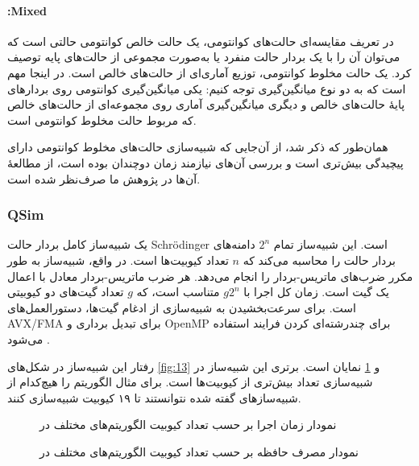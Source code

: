 \paragraph{:Mixed}
در تعریف مقایسه‌ای حالت‌های کوانتومی، یک حالت خالص کوانتومی حالتی است که می‌توان آن را با یک بردار حالت منفرد یا به‌صورت مجموعی از حالت‌های پایه توصیف کرد. یک حالت مخلوط کوانتومی، توزیع آماری‌ای از حالت‌های خالص است. در اینجا مهم است که به دو نوع میانگین‌گیری توجه کنیم: یکی میانگین‌گیری کوانتومی روی بردارهای پایهٔ حالت‌های خالص و دیگری میانگین‌گیری آماری روی مجموعه‌ای از حالت‌های خالص که مربوط حالت مخلوط کوانتومی است.

همان‌طور که ذکر شد، از آن‌جایی که شبیه‌سازی حالت‌های مخلوط کوانتومی دارای پیچیدگی بیش‌تری است و بررسی آن‌های نیازمند زمان دوچندان بوده است، از مطالعهٔ آن‌ها در پژوهش ما صرف‌نظر شده است.
\subsubsection{QSim}
یک شبیه‌ساز کامل بردار حالت Schrödinger است. این شبیه‌ساز تمام $2^n$ دامنه‌های بردار حالت را محاسبه می‌کند که $n$ تعداد کیوبیت‌ها است. در واقع، شبیه‌ساز به طور مکرر ضرب‌های ماتریس-بردار را انجام می‌دهد. هر ضرب ماتریس-بردار معادل با اعمال یک گیت است. زمان کل اجرا با $g2^n$ متناسب است، که $g$ تعداد گیت‌های دو کیوبیتی است. برای سرعت‌بخشیدن به شبیه‌سازی از ادغام گیت‌ها، دستورالعمل‌های AVX/FMA برای تبدیل برداری و OpenMP برای چندرشته‌ای کردن فرایند استفاده می‌شود
\cite{smelyanskiy_qhipster_2016}.

رفتار این شبیه‌ساز در شکل‌های \ref{fig:13} و \ref{fig:14} نمایان است. برتری این شبیه‌ساز در شبیه‌سازی تعداد بیش‌تری از کیوبیت‌ها است. برای مثال الگوریتم
را هیچ‌کدام از شبیه‌سازهای گفته شده نتوانستند تا ۱۹ کیوبیت شبیه‌سازی کنند.
\begin{figure}
	\centering
	\captionsetup{justification=centering}
	
	\caption{
		نمودار زمان اجرا بر حسب تعداد کیوبیت الگوریتم‌های مختلف در
	}
	\label{fig:13}
	\vspace{2cm}
	\captionsetup{justification=centering}
	
	\caption{
		نمودار مصرف حافظه بر حسب تعداد کیوبیت الگوریتم‌های مختلف در
	}
	\label{fig:14}
\end{figure}

